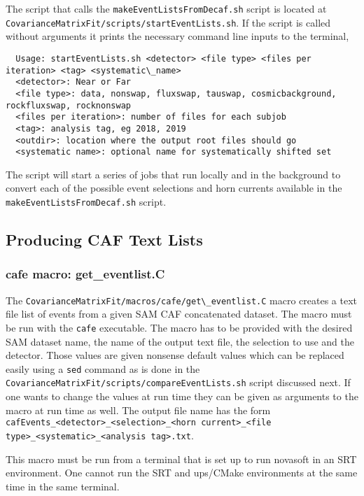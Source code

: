 The script that calls the \lstinline{makeEventListsFromDecaf.sh} script is located at \lstinline{CovarianceMatrixFit/scripts/startEventLists.sh}.  If the script is called without arguments it prints the necessary command line inputs to the terminal,
\begin{lstlisting}
  Usage: startEventLists.sh <detector> <file type> <files per iteration> <tag> <systematic\_name>
  <detector>: Near or Far
  <file type>: data, nonswap, fluxswap, tauswap, cosmicbackground, rockfluxswap, rocknonswap
  <files per iteration>: number of files for each subjob
  <tag>: analysis tag, eg 2018, 2019
  <outdir>: location where the output root files should go
  <systematic name>: optional name for systematically shifted set
\end{lstlisting}
The script will start a series of jobs that run locally and in the background to convert each of the possible event selections and horn currents available in the \lstinline{makeEventListsFromDecaf.sh} script.

\subsection{Producing CAF Text Lists}

\subsubsection{cafe macro: get\_eventlist.C}

The \lstinline{CovarianceMatrixFit/macros/cafe/get\_eventlist.C} macro creates a text file list of events from a given SAM CAF concatenated dataset.  The macro must be run with the \lstinline{cafe} executable.  The macro has to be provided with the desired SAM dataset name, the name of the output text file, the selection to use and the detector. Those values are given nonsense default values which can be replaced easily using a \lstinline{sed} command as is done in the \lstinline{CovarianceMatrixFit/scripts/compareEventLists.sh} script discussed next.  If one wants to change the values at run time they can be given as arguments to the macro at run time as well. The output file name has the form \lstinline{cafEvents_<detector>_<selection>_<horn current>_<file type>_<systematic>_<analysis tag>.txt}.

This macro must be run from a terminal that is set up to run novasoft in an SRT environment.  One cannot run the SRT and ups/CMake environments at the same time in the same terminal.

